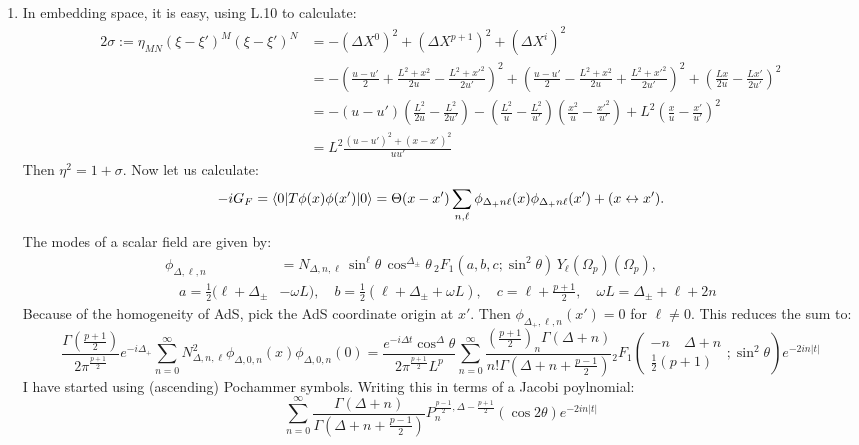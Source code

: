 \documentclass[11pt, class=article, crop=false]{standalone}
\begin{document}
\begin{enumerate}
	
	\item In embedding space, it is easy, using L.10 to calculate:
	\[
		\begin{aligned}
			2\sigma := \eta_{MN} (\xi - \xi')^M (\xi - \xi')^N &= -(\Delta X^0)^2 + (\Delta X^{p+1})^2 + (\Delta X^i)^2 \\
			&= -\left(\tfrac{u-u'}{2} + \tfrac{L^2 + x^2}{2u} - \tfrac{L^2 + {x'}^2}{2u'}\right)^2 
			+ \left(\tfrac{u-u'}{2} -  \tfrac{L^2 + x^2}{2u} + \tfrac{L^2 + {x'}^2}{2u'}\right)^2 + \left(\tfrac{L x}{2u} - \tfrac{L x'}{2u'} \right)^2\\
			&= - (u-u')\left(\frac{L^2}{2u} - \frac{L^2}{2u'} \right) - \left(\frac{L^2}{u} - \frac{L^2}{u'} \right) \left(\frac{x^2}{u} - \frac{{x'}^2}{u'} \right) + L^2 \left(\frac{x}{u} - \frac{x'}{u'} \right)^2\\
			&= L^2 \frac{(u-u')^2 + (x-x')^2}{u u'}
		\end{aligned}
	\]
	Then $\eta^2 = 1+\sigma$. Now let us calculate:
	\[
		-iG_F = \braket{0| T \phi(x) \phi(x')| 0} =  \Theta(x-x')\sum_{n, \ell} \phi_{\Delta_+ n \ell}(x) \phi_{\Delta_+ n \ell}(x') + (x \leftrightarrow x').
	\]
	The modes of a scalar field are given by:
	\[
	\begin{aligned}
		\phi_{\Delta, \ell, n} &=  N_{\Delta, n, \ell} \, \sin^\ell \theta\, \cos^{\Delta_\pm} \theta\, {_2F_1}(a, b, c; \sin^2 \theta) \, Y_{\ell}(\Omega_p) (\Omega_p),\\ \quad a = \frac12 (\ell + \Delta_{\pm}& - \omega L), \quad b = \frac12 (\ell + \Delta_{\pm} + \omega L),\quad c = \ell+\frac{p+1}{2}, \quad \omega L = \Delta_\pm + \ell + 2n
	\end{aligned}
	\] 
	Because of the homogeneity of AdS, pick the AdS coordinate origin at $x'$. Then $\phi_{\Delta_+, \ell, n}(x') = 0$ for $\ell \neq 0$. This reduces the sum to:
	\[
		\frac{\Gamma(\frac{p+1}{2})}{2 \pi^{\frac{p+1}{2}}} e^{-i \Delta_+}\sum_{n=0}^\infty N_{\Delta, n, \ell}^2 \phi_{\Delta, 0, n}(x) \phi_{\Delta, 0, n}(0) = \frac{e^{-i \Delta t} \cos^{\Delta} \theta}{2 \pi^{\frac{p+1}{2}} L^p} \sum_{n=0}^\infty \frac{(\frac{p+1}{2})_n \Gamma(\Delta + n)}{n! \Gamma(\Delta + n + \frac{p-1}{2})} {_2F_1}\left(\begin{matrix}
			-n \quad  \Delta + n\\ \frac12(p+1)
		\end{matrix}; \sin^2 \theta \right) e^{-2 i n |t|}
	\]
	I have started using (ascending) Pochammer symbols. 
	Writing this in terms of a Jacobi poylnomial:
	\[
		\sum_{n=0}^\infty \frac{\Gamma(\Delta + n)}{\Gamma(\Delta + n + \frac{p-1}{2})} P^{\frac{p-1}{2}, \Delta - \frac{p+1}{2}}_n (\cos 2 \theta) e^{-2 i n |t|}
\]
\end{enumerate}
\end{document}
